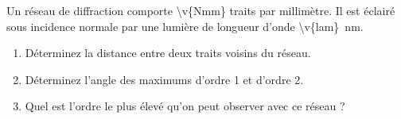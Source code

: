 Un réseau de diffraction comporte \num{\v{Nmm}} traits par millimètre. Il est éclairé sous incidence normale par une lumière de longueur d'onde \qty{\v{lam}}{nm}.

\begin{enumerate}[label=\alph*)]
    \item Déterminez la distance entre deux traits voisins du réseau.
    \item Déterminez l'angle des maximums d'ordre 1 et d'ordre 2.
    \item Quel est l'ordre le plus élevé qu'on peut observer avec ce réseau ?
\end{enumerate}
